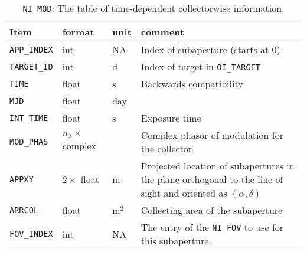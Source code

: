             \begin{table}
                \caption{\texttt{NI\_MOD}: The table of time-dependent collectorwise information. }
                \begin{tabular}{lp{}lp{}}
                    \hline
                    \hline
                    Item  & format & unit & comment\\
                    \hline
                    \texttt{APP\_INDEX} & int & NA & Index of subaperture (starts at 0)\\
                    \texttt{TARGET\_ID} & int & d & Index of target in \texttt{OI\_TARGET}\\
                    \texttt{TIME}      & float & s & Backwards compatibility \\
                    \texttt{MJD} & float & day & \\
                    \texttt{INT\_TIME} & float & s & Exposure time \\
                    \texttt{MOD\_PHAS} & $n_{\lambda} \times $ complex &  & Complex phasor of modulation for the collector \\
                    \texttt{APPXY} & $2 \times$ float & m & Projected location of subapertures in the plane orthogonal to the line of sight and oriented as $(\alpha, \delta)$ \\
                    \texttt{ARRCOL} & float & $\mathrm{m}^2$ & Collecting area of the subaperture \\
                    \texttt{FOV\_INDEX} & int & NA & The entry of the \texttt{NI\_FOV} to use for this subaperture.
                \end{tabular}
            \end{table}


